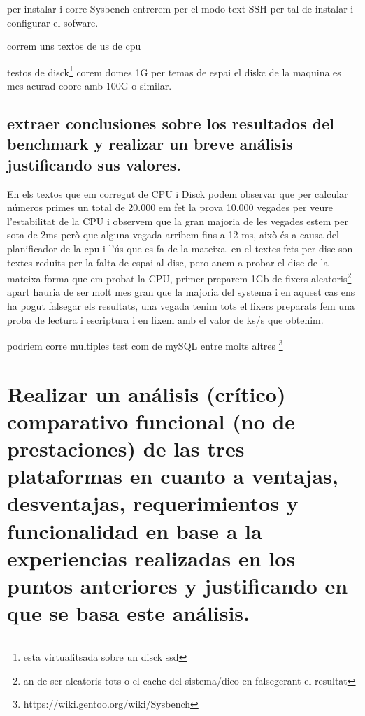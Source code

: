 \documentclass[preprint,11pt]{elsarticle}
\begin{document}
per instalar i corre Sysbench entrerem per el modo text SSH per tal de instalar i configurar el sofware.
\smallskip

correm uns textos de us de cpu 
\smallskip

\clearpage

testos de disck\footnote{esta virtualitsada sobre un disck ssd} corem domes 1G per temas de espai el diskc de la maquina es mes acurad coore amb 100G o similar.

\smallskip

\subsection{extraer conclusiones sobre los resultados del benchmark y realizar un breve análisis justificando sus valores.}
En els textos que em corregut de CPU i Disck podem observar que per calcular números primes un total de 20.000 em fet la prova 10.000 vegades per veure l'estabilitat de la CPU i observem que la gran majoria de les vegades estem per sota de 2ms però que alguna vegada arribem fins a 12 ms, això és a causa del planificador de la cpu i l'ús que es fa de la mateixa.\newline
en el textes fets per disc son textes reduits per la falta de espai al disc, pero anem a probar el disc de la mateixa forma que em probat la CPU, primer preparem 1Gb de fixers aleatoris\footnote{an de ser aleatoris tots o el cache del sistema/dico en falsegerant el resultat} apart hauria de ser molt mes gran que la majoria del systema i en aquest cas ens ha pogut falsegar els resultats, una vegada tenim tots el fixers preparats fem una proba de lectura i escriptura i en fixem amb el valor de ks/s que obtenim.\smallskip

podriem corre multiples test com de mySQL entre molts altres \footnote{https://wiki.gentoo.org/wiki/Sysbench}

\section{Realizar un análisis (crítico) comparativo funcional (no de prestaciones) de las tres plataformas en cuanto a ventajas, desventajas, requerimientos y funcionalidad en base a la experiencias realizadas en los puntos anteriores y justificando en que se basa este análisis.}
\end{document}
